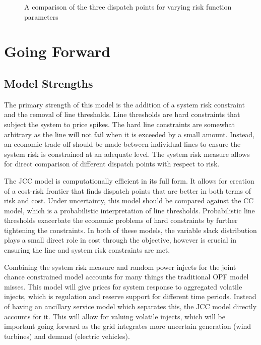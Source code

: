 \begin{figure}
\centering

\caption{A comparison of the three dispatch points for varying risk function parameters}\label{figsense}
\end{figure}






\section{Going Forward}

\subsection{Model Strengths}
The primary strength of this model is the addition of a system risk constraint and the removal of line thresholds. Line thresholds are hard constraints that subject the system to price spikes.  The hard line constraints are somewhat arbitrary as the line will not fail when it is exceeded by a small amount.  Instead, an economic trade off should be made between individual lines to ensure the system risk is constrained at an adequate level.  The system risk measure allows for direct comparison of different dispatch points with respect to risk.

The JCC model is computationally efficient in its full form.  It allows for creation of a cost-risk frontier that finds dispatch points that are better in both terms of risk and cost.  Under uncertainty, this model should be compared against the CC model, which is a probabilistic interpretation of line thresholds.  Probabilistic line thresholds exacerbate the economic problems of hard constraints by further tightening the constraints.  In both of these models, the variable slack distribution plays a small direct role in cost through the objective, however is crucial in ensuring the line and system risk constraints are met.  
  
Combining the system risk measure and random power injects for the joint chance constrained model accounts for many things the traditional OPF model misses.  This model will give prices for system response to aggregated volatile injects, which is regulation and reserve support for different time periods.  Instead of having an ancillary service model which separates this, the JCC model directly accounts for it.  This will allow for valuing volatile injects, which will be important going forward as the grid integrates more uncertain generation (wind turbines) and demand (electric vehicles).

